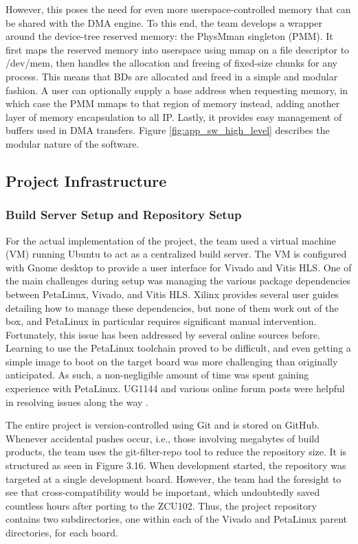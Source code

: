 \documentclass{article}
\begin{document}
    \par 	However, this poses the need for even more userspace-controlled memory that can be shared with the DMA engine. To this end, the team develops a wrapper around the device-tree reserved memory: the PhysMman singleton (PMM). It first maps the reserved memory into userspace using mmap on a file descriptor to /dev/mem, then handles the allocation and freeing of fixed-size chunks for any process. This means that BDs are allocated and freed in a simple and modular fashion. A user can optionally supply a base address when requesting memory, in which case the PMM mmaps to that region of memory instead, adding another layer of memory encapsulation to all IP. Lastly, it provides easy management of buffers used in DMA transfers. Figure \ref{fig:app_sw_high_level} describes the modular nature of the software. 

    \subsection{Project Infrastructure}
        \subsubsection{Build Server Setup and Repository Setup}
        \noindent For the actual implementation of the project, the team used a virtual machine (VM) running Ubuntu to act as a centralized build server. The VM is configured with Gnome desktop to provide a user interface for Vivado and Vitis HLS. One of the main challenges during setup was managing the various package dependencies between PetaLinux, Vivado, and Vitis HLS. Xilinx provides several user guides detailing how to manage these dependencies, but none of them work out of the box, and PetaLinux in particular requires significant manual intervention. Fortunately, this issue has been addressed by several online sources before. Learning to use the PetaLinux toolchain proved to be difficult, and even getting a simple image to boot on the target board was more challenging than originally anticipated. As such, a non-negligible amount of time was spent gaining experience with PetaLinux. UG1144 \cite{amd_plnx_ug} and various online forum posts were helpful in resolving issues along the way \cite{knitter_vivado_2023}.
        \par  The entire project is version-controlled using Git and is stored on GitHub. Whenever accidental pushes occur, i.e., those involving megabytes of build products, the team uses the git-filter-repo tool \cite{newren_newrengit-filter-repo_2025} to reduce the repository size. It is structured as seen in Figure 3.16. When development started, the repository was targeted at a single development board. However, the team had the foresight to see that cross-compatibility would be important, which undoubtedly saved countless hours after porting to the ZCU102. Thus, the project repository contains two subdirectories, one within each of the Vivado and PetaLinux parent directories, for each board. 
\end{document}
